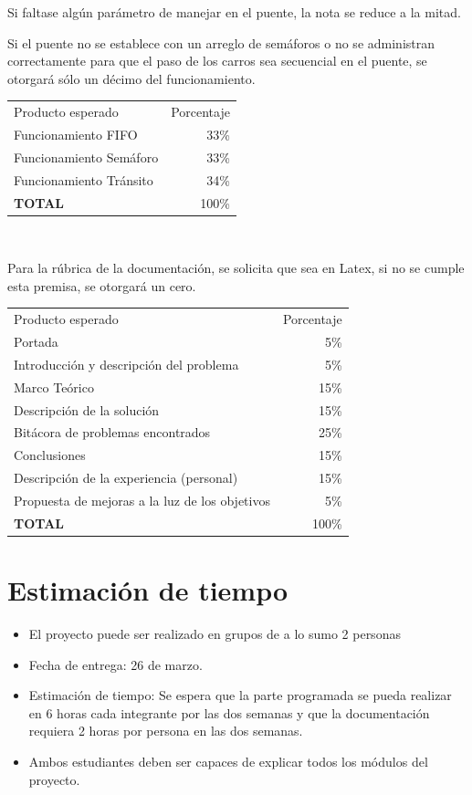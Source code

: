 \documentclass[11pt]{article}
\begin{document}
Si faltase algún parámetro de manejar en el puente, la nota se reduce a la mitad. 

Si el puente no se establece con un arreglo de semáforos o no se administran correctamente para que el paso de los carros sea secuencial en el puente, se otorgará sólo un décimo del funcionamiento.\\
\begin{tabular}{|lr|}
\hline
	Producto esperado & Porcentaje\\
	Funcionamiento FIFO & 33\%\\
	Funcionamiento Semáforo & 33\%\\
	Funcionamiento Tránsito & 34\%\\
	\textbf{TOTAL} & 100\%\\
\hline
\end{tabular}
\\\newpage

Para la rúbrica de la documentación, se solicita que sea en Latex, si no se cumple esta premisa, se otorgará un cero.\\
\begin{tabular}{|lr|}
\hline
	Producto esperado & Porcentaje\\
	Portada & 5\%\\
	Introducción y descripción del problema & 5\%\\
	Marco Teórico & 15\%\\
	Descripción de la solución & 15\%\\
	Bitácora de problemas encontrados & 25\%\\
	Conclusiones & 15\%\\
	Descripción de la experiencia (personal) & 15\%\\
	Propuesta de mejoras a la luz de los objetivos & 5\%\\
	\textbf{TOTAL} & 100\%\\
\hline
\end{tabular}



\section{Estimación de tiempo}
\begin{itemize}
\item El proyecto puede ser realizado en grupos de a lo sumo 2 personas
\item Fecha de entrega: 26 de marzo.
\item Estimación de tiempo: Se espera que la parte programada se pueda realizar en 6 horas cada integrante por las dos semanas y que la documentación requiera 2 horas por persona en las dos semanas.
\item Ambos estudiantes deben ser capaces de explicar todos los módulos del proyecto.
\end{itemize}
\end{document}
